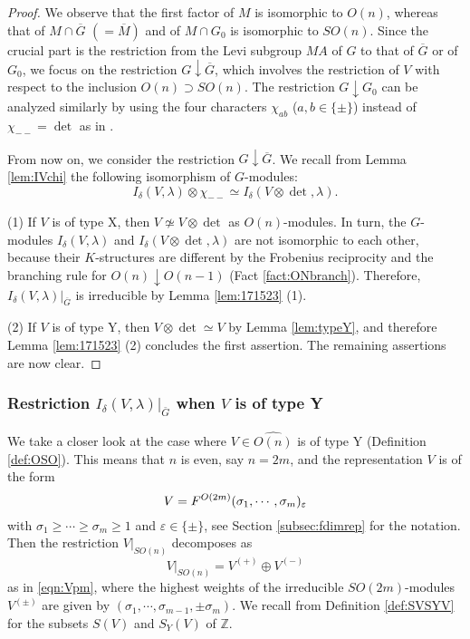 \begin{proof}
We observe
 that the first factor of $M$ is isomorphic to $O(n)$, 
 whereas that of $M \cap \overline G$
 $(=\overline M)$
 and of $M \cap G_0$ is isomorphic to $S O(n)$.  
Since the crucial part is the restriction from 
 the Levi subgroup $M A$ of $G$
 to that of $\overline G$ or of $G_0$, 
 we focus on the restriction $G \downarrow \overline G$, 
 which involves the restriction of $V$
 with respect to the inclusion $O(n) \supset S O(n)$.  
The restriction $G \downarrow G_0$ can be analyzed
 similarly by using the four characters
 $\chi_{a b}$ ($a,b \in \{\pm\}$)
 instead of $\chi_{--}=\det$
 as in \cite[Chap.~2, Sect.~5]{KKP}.



{}From now on,
 we consider the restriction $G \downarrow \overline G$.  
We recall from Lemma \ref{lem:IVchi}
 the following isomorphism of $G$-modules:
\[I_{\delta}(V, \lambda) \otimes \chi_{--}
 \simeq
 I_{\delta}(V \otimes \det, \lambda).  
\]
\par\noindent
(1)\enspace
If $V$ is of type X, 
then $V \not \simeq V \otimes \det$ as $O(n)$-modules.  
In turn, 
 the $G$-modules $I_{\delta}(V,\lambda)$ and $I_{\delta}(V\otimes \det,\lambda)$
 are not isomorphic to each other, 
 because their $K$-structures are different
 by the Frobenius reciprocity
 and the branching rule for $O(n) \downarrow O(n-1)$
 (Fact \ref{fact:ONbranch}).  
Therefore, 
 $I_{\delta}(V,\lambda)|_{\overline G}$ is irreducible
 by Lemma \ref{lem:171523} (1).  
\par\noindent
(2)\enspace
If $V$ is of type Y, 
 then $V \otimes \det \simeq V$
 by Lemma \ref{lem:typeY}, 
 and therefore Lemma \ref{lem:171523} (2) concludes the first assertion.  
The remaining assertions are now clear.  
\end{proof}

\subsubsection{Restriction $I_{\delta}(V,\lambda)|_{\overline G}$
 when $V$ is of type Y}
We take a closer look at the case
 where $V \in \widehat {O(n)}$ is of type Y
 (Definition \ref{def:OSO}).  
This means that $n$ is even, 
 say $n=2m$, 
 and the representation $V$ is of the form
\[
   V = F^{{O(2m)}}({\sigma_1, \cdots,\sigma_m})_{\varepsilon}
\]
with $\sigma_1 \ge \cdots \ge \sigma_m \ge 1$
 and $\varepsilon \in \{\pm\}$, 
 see Section \ref{subsec:fdimrep} for the notation.  
Then the restriction $V|_{S O(n)}$ decomposes
 as 
\[
  V|_{S O(n)}=V^{(+)} \oplus V^{(-)} 
\]
as in \eqref{eqn:Vpm}, 
 where the highest weights of the irreducible $SO(2m)$-modules
  $V^{(\pm)}$ are given by $(\sigma_1, \cdots,\sigma_{m-1}, \pm \sigma_m)$.  
We recall from Definition \ref{def:SVSYV}
 for the subsets $S(V)$ and $S_Y(V)$ of ${\mathbb{Z}}$.  

